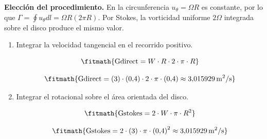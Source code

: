 \noindent\textbf{Elección del procedimiento.} En la circunferencia $u_\theta=\Omega R$ es constante, por lo que $\Gamma=\oint u_\theta dl=\Omega R(2\pi R)$. Por Stokes, la vorticidad uniforme $2\Omega$ integrada sobre el disco produce el mismo valor.

\begin{enumerate}

\item Integrar la velocidad tangencial en el recorrido positivo.

\[\fitmath{\mathrm{Gdirect}=W\cdot R\cdot 2\cdot \pi\cdot R}\]

\[\fitmath{\mathrm{Gdirect}=(3)\cdot (0{,}4)\cdot 2\cdot \pi\cdot (0{,}4)\approx 3{,}015929\,\mathrm{m^{2}/s}}\]

\item Integrar el rotacional sobre el área orientada del disco.

\[\fitmath{\mathrm{Gstokes}=2\cdot W\cdot \pi\cdot {R}^{2}}\]

\[\fitmath{\mathrm{Gstokes}=2\cdot (3)\cdot \pi\cdot {(0{,}4)}^{2}\approx 3{,}015929\,\mathrm{m^{2}/s}}\]

\end{enumerate}
